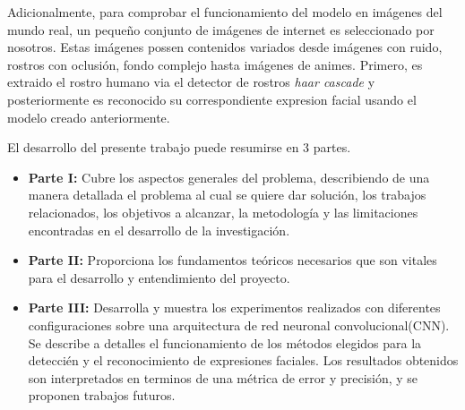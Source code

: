 Adicionalmente, para comprobar el funcionamiento del modelo en imágenes del mundo real, un pequeño conjunto de imágenes de internet es seleccionado por nosotros. Estas imágenes possen contenidos variados desde imágenes con ruido, rostros con oclusión, fondo complejo hasta imágenes de animes. Primero, es extraido el rostro humano via el detector de rostros \textit{haar cascade} y posteriormente es reconocido su correspondiente expresion facial usando el modelo creado anteriormente.

El desarrollo del presente trabajo puede resumirse en 3 partes.

\begin{itemize}
\item \textbf{Parte I:} Cubre los aspectos generales del problema, describiendo de una manera detallada el problema al cual se quiere dar solución, los trabajos relacionados, los objetivos a alcanzar, la metodología y las limitaciones encontradas en el desarrollo de la investigación.
\item \textbf{Parte II:} Proporciona los fundamentos teóricos necesarios que son vitales para el desarrollo y entendimiento del proyecto.
\item \textbf{Parte III:} Desarrolla y muestra los experimentos realizados con diferentes configuraciones sobre una arquitectura de red neuronal convolucional(CNN). Se describe a detalles el funcionamiento de los métodos elegidos para la deteccién y el reconocimiento de expresiones faciales. Los resultados obtenidos son interpretados en terminos de una métrica de error y precisión, y se proponen trabajos futuros.

 
 
  
\end{itemize}





